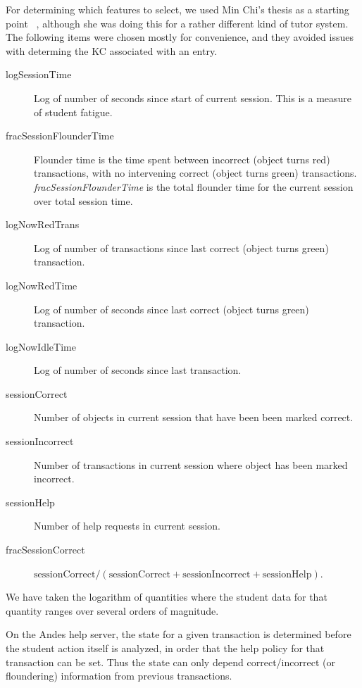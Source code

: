 \documentclass[11pt,letterpaper]{article}
\begin{document}
For determining which features to select, we used Min Chi's thesis
as a starting point ~\cite{mint}, although she was doing this for a
rather different kind of tutor system.  The following items were
chosen mostly for convenience, and they avoided issues with determing
the KC associated with an entry.
%
\begin{description}

\item[logSessionTime] Log of number of seconds since start of current
  session.  This is a measure of student fatigue.

\item[fracSessionFlounderTime] Flounder time is the time spent between 
incorrect (object turns red) transactions, with no intervening correct 
(object turns green) transactions. 
 {\em fracSessionFlounderTime} is the total flounder
time for the current session over total session time.

\item[logNowRedTrans] Log of number of transactions since last
  correct (object turns green) transaction.

\item[logNowRedTime] Log of number of seconds since last
  correct (object turns green) transaction.

\item[logNowIdleTime] Log of number of seconds since last transaction.

\item[sessionCorrect] Number of objects in current session that have
  been  been marked  correct.

\item[sessionIncorrect] Number of transactions in current session where 
   object has been marked  incorrect.

\item[sessionHelp] Number of help requests in current session.

\item[fracSessionCorrect] $\mbox{sessionCorrect}/\left(\mbox{sessionCorrect}+\mbox{sessionIncorrect}+\mbox{sessionHelp}\right)$.

\end{description}
%
We have taken the logarithm of quantities where the student data
for that quantity ranges over several orders of magnitude.

On the Andes help server, the state for a given transaction 
is determined before the student action itself is analyzed,
in order that the help policy for that transaction can be set.  
Thus the state can only depend correct/incorrect (or floundering) 
information from previous transactions. 
\end{document}
